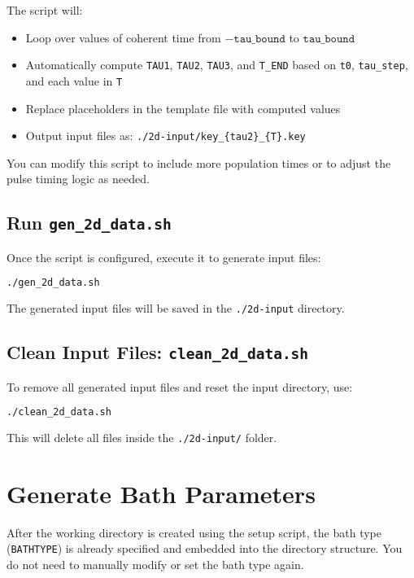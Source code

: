 \documentclass{article}
\begin{document}
The script will:

\begin{itemize}
    \item Loop over values of coherent time from \(-\texttt{tau\_bound}\) to \(\texttt{tau\_bound}\)
    \item Automatically compute \texttt{TAU1}, \texttt{TAU2}, \texttt{TAU3}, and \texttt{T\_END} based on \texttt{t0}, \texttt{tau\_step}, and each value in \texttt{T}
    \item Replace placeholders in the template file with computed values
    \item Output input files as: \texttt{./2d-input/key\_\{tau2\}\_\{T\}.key}
\end{itemize}

You can modify this script to include more population times or to adjust the pulse timing logic as needed.

\subsection*{Run \texttt{gen\_2d\_data.sh}}

Once the script is configured, execute it to generate input files:

\begin{lstlisting}[language=bash]
./gen_2d_data.sh
\end{lstlisting}

The generated input files will be saved in the \texttt{./2d-input} directory.

\subsection*{Clean Input Files: \texttt{clean\_2d\_data.sh}}

To remove all generated input files and reset the input directory, use:

\begin{lstlisting}[language=bash]
./clean_2d_data.sh
\end{lstlisting}

This will delete all files inside the \texttt{./2d-input/} folder.

\newpage

\section{Generate Bath Parameters}

After the working directory is created using the setup script, the bath type (\texttt{BATHTYPE}) is already specified and embedded into the directory structure. You do not need to manually modify or set the bath type again.
\end{document}
